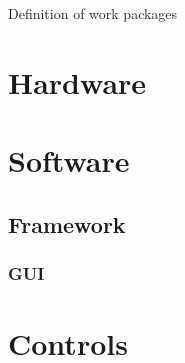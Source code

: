 Definition of work packages
\section{Hardware}
\section{Software}
\subsection{Framework}
\subsubsection{GUI}
\section{Controls}
